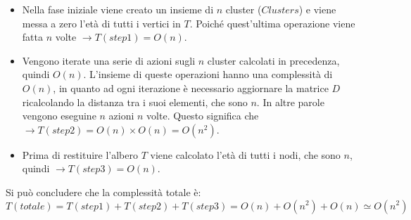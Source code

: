 \begin{itemize}
	\item Nella fase iniziale viene creato un insieme di $n$ cluster ($Clusters$) e viene messa a zero l'età di tutti i vertici in $T$. Poiché quest'ultima operazione viene fatta $n$ volte $\rightarrow T(step1)=O(n)$.
	\item Vengono iterate una serie di azioni sugli $n$ cluster calcolati in precedenza, quindi $O(n)$. L'insieme di queste operazioni hanno una complessità di $O(n)$, in quanto ad ogni iterazione è necessario aggiornare la matrice $D$ ricalcolando la distanza tra i suoi elementi, che sono $n$. In altre parole vengono eseguine $n$ azioni $n$ volte. Questo significa che $\rightarrow T(step2)=O(n) \times O(n) = O(n^2)$.
	\item Prima di restituire l'albero $T$ viene calcolato l'età di tutti i nodi, che sono $n$, quindi $\rightarrow T(step3)=O(n)$.
\end{itemize}
Si può concludere che la complessità totale è:
\[T(totale)=T(step1)+T(step2)+T(step3)=O(n)+O(n^2)+O(n)\simeq O(n^2)\]